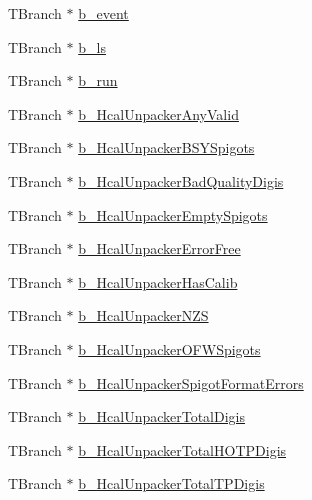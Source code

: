 \begin{DoxyCompactItemize}
\item 
T\+Branch $\ast$ \hyperlink{class_hcal_tuple_tree_a23277666c0cadc1107d47f62c8064a94}{b\+\_\+event}
\item 
T\+Branch $\ast$ \hyperlink{class_hcal_tuple_tree_ade006033ab46c1803517ad75d24fa344}{b\+\_\+ls}
\item 
T\+Branch $\ast$ \hyperlink{class_hcal_tuple_tree_a12b2c9703af3dd7246dbbe0ec1f84ee5}{b\+\_\+run}
\item 
T\+Branch $\ast$ \hyperlink{class_hcal_tuple_tree_a60a83ba3b2e47919e7c586143bae5a76}{b\+\_\+\+Hcal\+Unpacker\+Any\+Valid}
\item 
T\+Branch $\ast$ \hyperlink{class_hcal_tuple_tree_aed84d619963cc98e917ae9fd1c26ca5c}{b\+\_\+\+Hcal\+Unpacker\+B\+S\+Y\+Spigots}
\item 
T\+Branch $\ast$ \hyperlink{class_hcal_tuple_tree_aa9bb381f441b7cbbc3556f59fd6f7dc5}{b\+\_\+\+Hcal\+Unpacker\+Bad\+Quality\+Digis}
\item 
T\+Branch $\ast$ \hyperlink{class_hcal_tuple_tree_ae8069c5ef49af3ec4175e162b8287259}{b\+\_\+\+Hcal\+Unpacker\+Empty\+Spigots}
\item 
T\+Branch $\ast$ \hyperlink{class_hcal_tuple_tree_aec204fe1288b01a20b7c5230e2517dbb}{b\+\_\+\+Hcal\+Unpacker\+Error\+Free}
\item 
T\+Branch $\ast$ \hyperlink{class_hcal_tuple_tree_a82dd61dd9c6a16f3d38aad1f84265df8}{b\+\_\+\+Hcal\+Unpacker\+Has\+Calib}
\item 
T\+Branch $\ast$ \hyperlink{class_hcal_tuple_tree_a462c90b3a97d139de2e785a26663940c}{b\+\_\+\+Hcal\+Unpacker\+N\+Z\+S}
\item 
T\+Branch $\ast$ \hyperlink{class_hcal_tuple_tree_a489da1a30031418fc546260c3e5e7314}{b\+\_\+\+Hcal\+Unpacker\+O\+F\+W\+Spigots}
\item 
T\+Branch $\ast$ \hyperlink{class_hcal_tuple_tree_a01ade9dbb04c1484cf72f284148df1ae}{b\+\_\+\+Hcal\+Unpacker\+Spigot\+Format\+Errors}
\item 
T\+Branch $\ast$ \hyperlink{class_hcal_tuple_tree_a9f479c6cccde70cd1a3bd71679c686c5}{b\+\_\+\+Hcal\+Unpacker\+Total\+Digis}
\item 
T\+Branch $\ast$ \hyperlink{class_hcal_tuple_tree_accf114a01da5500535692994685688af}{b\+\_\+\+Hcal\+Unpacker\+Total\+H\+O\+T\+P\+Digis}
\item 
T\+Branch $\ast$ \hyperlink{class_hcal_tuple_tree_a6325dfc7baa69f77cfe6d013d6364924}{b\+\_\+\+Hcal\+Unpacker\+Total\+T\+P\+Digis}
\end{DoxyCompactItemize}


